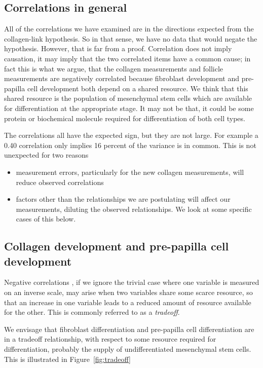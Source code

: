 \documentclass[titlepage]{article}  %
\begin{document}
\subsection{Correlations in general}
 All of the correlations we have examined are in the directions expected from the collagen-link hypothesis.  So in that sense, we have no data that would negate the hypothesis. However, that is far from a proof. Correlation does not imply causation, it may imply that the two correlated items have a common cause; in fact this is what we argue, that the collagen measurements and follicle measurements are negatively correlated because fibroblast development and pre-papilla cell development both depend on a shared resource. We think that this shared resource is the population of mesenchymal stem cells which are available for differentiation at the appropriate stage. It may not be that, it could be some protein or biochemical molecule required for differentiation of both cell types.

The correlations all have the expected sign, but they are not large. For example a 0.40 correlation only implies 16 percent of the variance is in common. This is not unexpected for two reasons
\begin{itemize}
\item measurement errors, particularly for the new collagen measurements, will reduce observed correlations
\item factors other than the relationships we are postulating will affect our measurements, diluting the observed relationships. We look at some specific cases of this below.
\end{itemize}

\subsection{Collagen development and pre-papilla cell development}
Negative correlations , if we ignore the trivial case where one variable is measured on an inverse scale, may arise when two variables share some scarce resource, so that an increase in one variable leads to a reduced amount of resource available for the other. This is commonly referred to as a {\em tradeoff}.

We envisage that fibroblast differentiation and pre-papilla cell differentiation are in a tradeoff relationship, with respect to some resource required for differentiation, probably the supply of undifferentiated mesenchymal stem cells. This is illustrated in Figure~\ref{fig:tradeoff}

\end{document}
